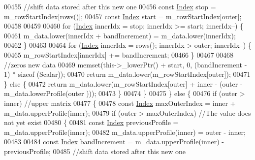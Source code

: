 \begin{DoxyCode}
00455                     \textcolor{comment}{//shift data stored after this new one}
00456                     \textcolor{keyword}{const} \hyperlink{group___core___module_a554f30542cc2316add4b1ea0a492ff02}{Index} stop = m\_rowStartIndex[rows()];
00457                     \textcolor{keyword}{const} \hyperlink{group___core___module_a554f30542cc2316add4b1ea0a492ff02}{Index} start = m\_rowStartIndex[outer];
00458 
00459 
00460                     \textcolor{keywordflow}{for} (\hyperlink{group___core___module_a554f30542cc2316add4b1ea0a492ff02}{Index} innerIdx = stop; innerIdx >= start; innerIdx--) \{
00461                         m\_data.lower(innerIdx + bandIncrement) = m\_data.lower(innerIdx);
00462                     \}
00463 
00464                     \textcolor{keywordflow}{for} (\hyperlink{group___core___module_a554f30542cc2316add4b1ea0a492ff02}{Index} innerIdx = rows(); innerIdx > outer; innerIdx--) \{
00465                         m\_rowStartIndex[innerIdx] += bandIncrement;
00466                     \}
00467 
00468                     \textcolor{comment}{//zeros new data}
00469                     memset(this->\_lowerPtr() + start, 0, (bandIncrement - 1) * \textcolor{keyword}{sizeof} (Scalar));
00470                     \textcolor{keywordflow}{return} m\_data.lower(m\_rowStartIndex[outer]);
00471                 \} \textcolor{keywordflow}{else} \{
00472                     \textcolor{keywordflow}{return} m\_data.lower(m\_rowStartIndex[outer] + inner - (outer - m\_data.lowerProfile(outer
      )));
00473                 \}
00474             \}
00475         \} \textcolor{keywordflow}{else} \{
00476             \textcolor{keywordflow}{if} (outer > inner) \textcolor{comment}{//upper matrix}
00477             \{
00478                 \textcolor{keyword}{const} \hyperlink{group___core___module_a554f30542cc2316add4b1ea0a492ff02}{Index} maxOuterIndex = inner + m\_data.upperProfile(inner);
00479                 \textcolor{keywordflow}{if} (outer > maxOuterIndex) \textcolor{comment}{//The value does not yet exist}
00480                 \{
00481                     \textcolor{keyword}{const} \hyperlink{group___core___module_a554f30542cc2316add4b1ea0a492ff02}{Index} previousProfile = m\_data.upperProfile(inner);
00482                     m\_data.upperProfile(inner) = outer - inner;
00483 
00484                     \textcolor{keyword}{const} \hyperlink{group___core___module_a554f30542cc2316add4b1ea0a492ff02}{Index} bandIncrement = m\_data.upperProfile(inner) - previousProfile;
00485                     \textcolor{comment}{//shift data stored after this new one}

\end{DoxyCode}

